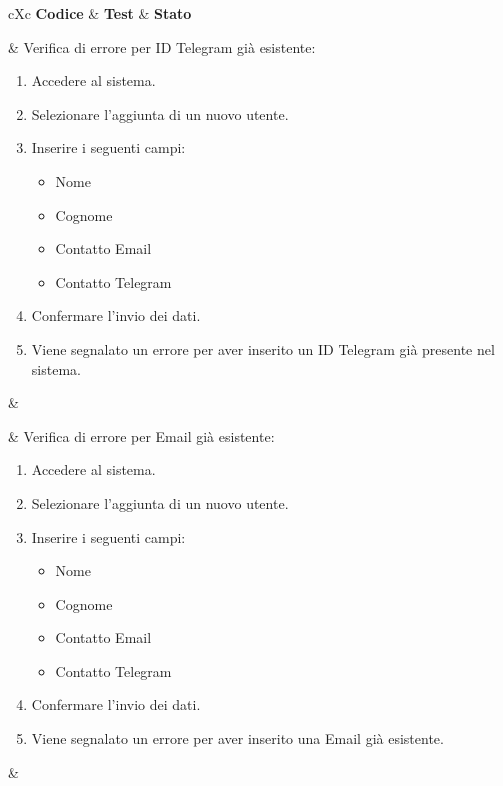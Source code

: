 \begin{table}[H]
	\begin{VTtable}[1.7]{\textwidth}{cXc}
		\rowcolor{\tablegray}
		\textbf{Codice} & \centering\textbf{Test} & \textbf{Stato} \\\toprule

         \addtotv & Verifica di errore per ID Telegram già esistente:
         \begin{enumerate}
             \item Accedere al sistema.
             \item Selezionare l'aggiunta di un nuovo utente.
             \item Inserire i seguenti campi:
             \begin{itemize}
                 \item Nome
                 \item Cognome
                 \item Contatto Email
                 \item Contatto Telegram
             \end{itemize}
             \item Confermare l'invio dei dati.
             \item Viene segnalato un errore per aver inserito un ID Telegram già presente nel sistema.
         \end{enumerate}
         & \TNI \\\midrule

        \addtotv & Verifica di errore per Email già esistente:
        \begin{enumerate}
            \item Accedere al sistema.
            \item Selezionare l'aggiunta di un nuovo utente.
            \item Inserire i seguenti campi:
            \begin{itemize}
                \item Nome
                \item Cognome
                \item Contatto Email
                \item Contatto Telegram
            \end{itemize}
            \item Confermare l'invio dei dati.
            \item Viene segnalato un errore per aver inserito una Email già esistente.
        \end{enumerate}
        & \TNI \\\midrule


\end{VTtable}
\end{table}
